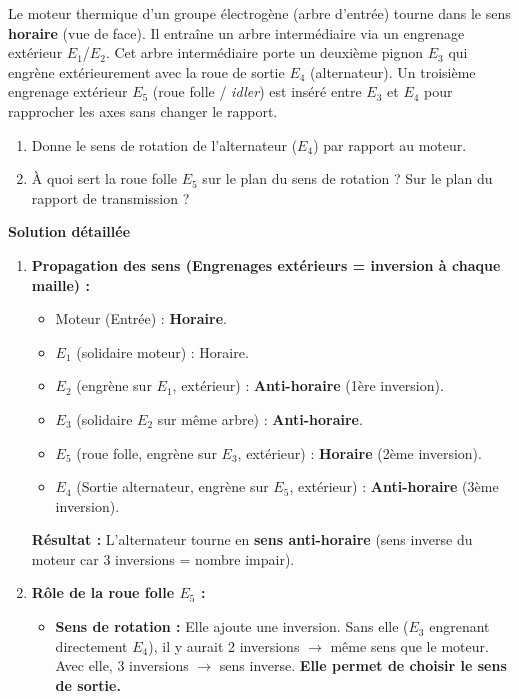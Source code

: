 \documentclass[11pt]{article}
\begin{document}
\begin{exoresolu}
    Le moteur thermique d'un groupe électrogène (arbre d'entrée) tourne dans le sens \textbf{horaire} (vue de face). Il entraîne un arbre intermédiaire via un engrenage extérieur $E_1$/$E_2$. Cet arbre intermédiaire porte un deuxième pignon $E_3$ qui engrène extérieurement avec la roue de sortie $E_4$ (alternateur). Un troisième engrenage extérieur $E_5$ (roue folle / \emph{idler}) est inséré entre $E_3$ et $E_4$ pour rapprocher les axes sans changer le rapport.
    \begin{enumerate}
        \item Donne le sens de rotation de l'alternateur ($E_4$) par rapport au moteur.
        \item À quoi sert la roue folle $E_5$ sur le plan du sens de rotation ? Sur le plan du rapport de transmission ?
    \end{enumerate}
    \tcblower
    \textbf{Solution détaillée}
    \begin{enumerate}
        \item \textbf{Propagation des sens (Engrenages extérieurs = inversion à chaque maille) :}
              \begin{itemize}
                  \item Moteur (Entrée) : \textbf{Horaire}.
                  \item $E_1$ (solidaire moteur) : Horaire.
                  \item $E_2$ (engrène sur $E_1$, extérieur) : \textbf{Anti-horaire} (1ère inversion).
                  \item $E_3$ (solidaire $E_2$ sur même arbre) : \textbf{Anti-horaire}.
                  \item $E_5$ (roue folle, engrène sur $E_3$, extérieur) : \textbf{Horaire} (2ème inversion).
                  \item $E_4$ (Sortie alternateur, engrène sur $E_5$, extérieur) : \textbf{Anti-horaire} (3ème inversion).
              \end{itemize}
              \textbf{Résultat :} L'alternateur tourne en \textbf{sens anti-horaire} (sens inverse du moteur car 3 inversions = nombre impair).
        \item \textbf{Rôle de la roue folle $E_5$ :}
              \begin{itemize}
                  \item \textbf{Sens de rotation :} Elle ajoute une inversion. Sans elle ($E_3$ engrenant directement $E_4$), il y aurait 2 inversions $\rightarrow$ même sens que le moteur. Avec elle, 3 inversions $\rightarrow$ sens inverse. \textbf{Elle permet de choisir le sens de sortie.}

\end{itemize}
\end{enumerate}
\end{exoresolu}
\end{document}
